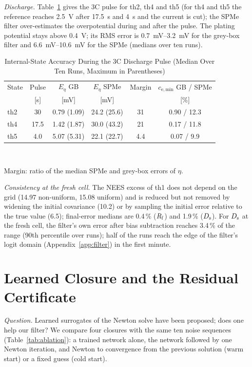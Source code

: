 \documentclass[journal]{IEEEtran}
\begin{document}
\emph{Discharge.} Table~\ref{tab:baseline} gives the 3C pulse for th2, th4 and th5 (for th4 and th5 the reference reaches \SI{2.5}{\volt} after \SI{17.5}{\second} and \SI{4}{\second} and the current is cut); the SPMe filter over-estimates the overpotential during and after the pulse. The plating potential stays above \SI{0.4}{\volt}; its RMS error is \SIrange{0.7}{3.2}{\milli\volt} for the grey-box filter and \SIrange{6.6}{10.6}{\milli\volt} for the SPMe (medians over ten runs).
\begin{table}[t]
\centering
\caption{Internal-State Accuracy During the 3C Discharge Pulse (Median Over Ten Runs, Maximum in Parentheses)}
\label{tab:baseline}
\footnotesize\setlength{\tabcolsep}{3pt}
\begin{tabular}{@{}lccccc@{}}
\toprule
State & Pulse & $E_\eta$ GB & $E_\eta$ SPMe & Margin & $c_{\mathrm{e,min}}$ GB / SPMe\\
 & [s] & [mV] & [mV] & & [\%]\\
\midrule
th2 & 30 & 0.79 (1.09) & 24.2 (25.6) & 31 & 0.90 / 12.3\\
th4 & 17.5 & 1.42 (1.87) & 30.0 (43.2) & 21 & 0.17 / 11.8\\
th5 & 4.0 & 5.07 (5.31) & 22.1 (22.7) & 4.4 & 0.07 / 9.9\\
\bottomrule
\end{tabular}\\[2pt]
\parbox{\columnwidth}{\footnotesize Margin: ratio of the median SPMe and grey-box errors of $\eta$.}
\end{table}

\emph{Consistency at the fresh cell.} The NEES excess of th1 does not depend on the grid (14.97 non-uniform, 15.08 uniform) and is reduced but not removed by widening the initial covariance (10.2) or by sampling the initial error relative to the true value (6.5); final-error medians are 0.4\,\% ($R_{\mathrm{f}}$) and 1.9\,\% ($D_{\mathrm{s}}$). For $D_{\mathrm{s}}$ at the fresh cell, the filter's own error after bias subtraction reaches 3.4\,\% of the range (90th percentile over runs); half of the runs reach the edge of the filter's logit domain (Appendix~\ref{app:filter}) in the first minute.

\section{Learned Closure and the Residual Certificate}\label{app:closure}
\emph{Question.} Learned surrogates of the Newton solve have been proposed\cite{minn2024}; does one help our filter? We compare four closures with the same ten noise sequences (Table~\ref{tab:ablation}): a trained network alone, the network followed by one Newton iteration, and Newton to convergence from the previous solution (warm start) or a fixed guess (cold start).
\end{document}
